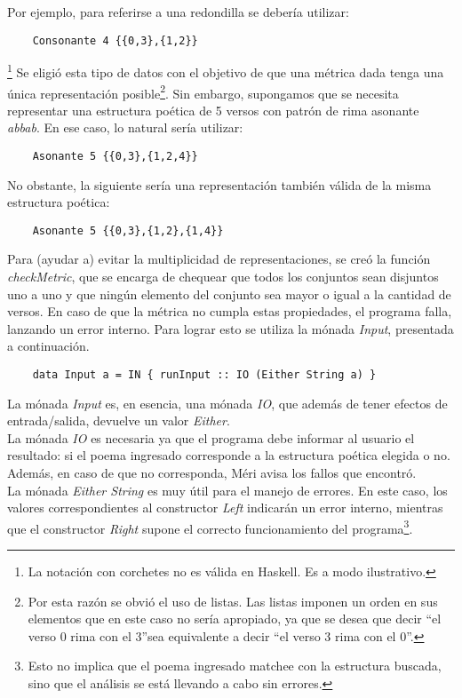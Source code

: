 \documentclass[12pt, a4paper]{article}
\begin{document}
Por ejemplo, para referirse a una redondilla se debería utilizar:
\begin{verbatim}
    Consonante 4 {{0,3},{1,2}}
\end{verbatim} \footnote{La notación con corchetes no es válida en Haskell. Es a modo ilustrativo.}
Se eligió esta tipo de datos con el objetivo de que una métrica dada tenga una única representación posible\footnote{Por esta razón se obvió el uso de listas. Las listas imponen un orden en sus elementos que en este caso no sería apropiado, ya que se desea que decir \textquotedblleft el verso 0 rima con el 3\textquotedblright  sea equivalente a decir \textquotedblleft el verso 3 rima con el 0\textquotedblright.}. Sin embargo, supongamos que se necesita representar una estructura poética de 5 versos con patrón de rima asonante \textit{abbab}. En ese caso, lo natural sería utilizar:
\begin{verbatim}
    Asonante 5 {{0,3},{1,2,4}}
\end{verbatim}
No obstante, la siguiente sería una representación también válida de la misma estructura poética:
\begin{verbatim}
    Asonante 5 {{0,3},{1,2},{1,4}}
\end{verbatim}
Para (ayudar a) evitar la multiplicidad de representaciones, se creó la función \textit{checkMetric}, que se encarga de chequear que todos los conjuntos sean disjuntos uno a uno y que ningún elemento del conjunto sea mayor o igual a la cantidad de versos. En caso de que la métrica no cumpla estas propiedades, el programa falla, lanzando un error interno. Para lograr esto se utiliza la mónada \textit{Input}, presentada a continuación.
\begin{verbatim}
    data Input a = IN { runInput :: IO (Either String a) }
\end{verbatim}
La mónada \textit{Input} es, en esencia, una mónada \textit{IO}, que además de tener efectos de entrada/salida, devuelve un valor \textit{Either}. \\
La mónada \textit{IO} es necesaria ya que el programa debe informar al usuario el resultado: si el poema ingresado corresponde a la estructura poética elegida o no. Además, en caso de que no corresponda, Méri avisa los fallos que encontró. \\
La mónada \textit{Either String} es muy útil para el manejo de errores. En este caso, los valores correspondientes al constructor \textit{Left} indicarán un error interno, mientras que el constructor \textit{Right} supone el correcto funcionamiento del programa\footnote{Esto no implica que el poema ingresado matchee con la estructura buscada, sino que el análisis se está llevando a cabo sin errores.}. 
\end{document}
